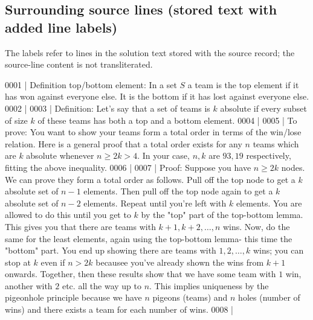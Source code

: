 \documentclass[11pt]{article}
\begin{document}
\subsection*{Surrounding source lines (stored text with added line labels)}
The labels refer to lines in the solution text stored with the source record; the source-line content is not transliterated.
\begin{Vsrc}
0001 | Definition top/bottom element: In a set $S$ a team is the top element if it has won against everyone else. It is the bottom if it has lost against everyone else.
0002 | 
0003 | Definition: Let's say that a set of teams is $k$ absolute if every subset of size $k$ of these teams has both a top and a bottom element.
0004 | 
0005 | To prove: You want to show your teams form a total order in terms of the win/lose relation. Here is a general proof that a total order exists for any $n$ teams which are $k$ absolute whenever $n \geq 2k > 4$. In your case, $n, k$ are $93, 19$ respectively, fitting the above inequality.
0006 | 
0007 | Proof: Suppose you have $n \geq 2k$ nodes. We can prove they form a total order as follows. Pull off the top node to get a $k$ absolute set of $n-1$ elements. Then pull off the top node again to get a $k$ absolute set of $n-2$ elements. Repeat until you're left with $k$ elements. You are allowed to do this until you get to $k$ by the "top" part of the top-bottom lemma. This gives you that there are teams with $k+1, k+2, \dots, n$ wins. Now, do the same for the least elements, again using the top-bottom lemma- this time the "bottom" part. You end up showing there are teams with $1, 2, \dots, k$ wins; you can stop at $k$ even if $n > 2k$ becausee you've already shown the wins from $k+1$ onwards. Together, then these results show that we have some team with $1$ win, another with $2$ etc. all the way up to $n$. This implies uniqueness by the pigeonhole principle because we have $n$ pigeons (teams) and $n$ holes (number of wins) and there exists a team for each number of wins.
0008 | 

\end{Vsrc}
\end{document}
